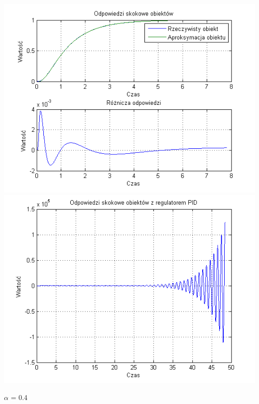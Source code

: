 \documentclass[10pt,a4paper]{article}
\begin{document}
\begin{center}
\includegraphics[scale=1]{images/dwa/skrypt_121.png}\\
\includegraphics[scale=1]{images/dwa/skrypt_122.png}\\
\end{center}
\newpage
$\alpha$ = 0.4
\end{document}
